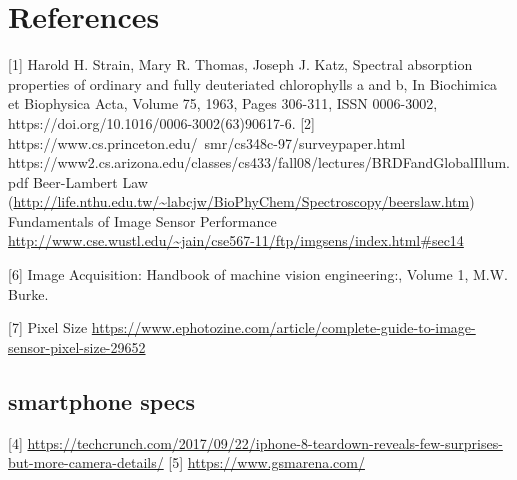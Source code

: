 \documentclass{article}
\begin{document}
\section{References}
[1] Harold H. Strain, Mary R. Thomas, Joseph J. Katz, Spectral absorption properties of ordinary and fully deuteriated chlorophylls a and b,
In Biochimica et Biophysica Acta, Volume 75, 1963, Pages 306-311,
ISSN 0006-3002, https://doi.org/10.1016/0006-3002(63)90617-6. \newline
[2] https://www.cs.princeton.edu/~smr/cs348c-97/surveypaper.html \newline
[3] https://www2.cs.arizona.edu/classes/cs433/fall08/lectures/BRDFandGlobalIllum.pdf
\newline
[4] Beer-Lambert Law (\url{http://life.nthu.edu.tw/~labcjw/BioPhyChem/Spectroscopy/beerslaw.htm}) \newline
[5] Fundamentals of Image Sensor Performance \url{http://www.cse.wustl.edu/~jain/cse567-11/ftp/imgsens/index.html#sec14}

[6] Image Acquisition: Handbook of machine vision engineering:, Volume 1, M.W. Burke.

[7] Pixel Size \url{https://www.ephotozine.com/article/complete-guide-to-image-sensor-pixel-size-29652}

\subsection{smartphone specs}
[4] \url{https://techcrunch.com/2017/09/22/iphone-8-teardown-reveals-few-surprises-but-more-camera-details/}
[5] \url{https://www.gsmarena.com/}
\end{document}
